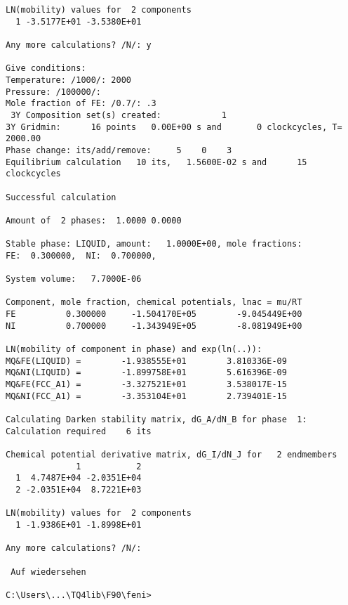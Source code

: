 \documentclass[12pt]{article}
\begin{document}
{\begin{verbatim}
LN(mobility) values for  2 components
  1 -3.5177E+01 -3.5380E+01

Any more calculations? /N/: y

Give conditions:
Temperature: /1000/: 2000
Pressure: /100000/:
Mole fraction of FE: /0.7/: .3
 3Y Composition set(s) created:            1
3Y Gridmin:      16 points   0.00E+00 s and       0 clockcycles, T= 2000.00
Phase change: its/add/remove:     5    0    3
Equilibrium calculation   10 its,   1.5600E-02 s and      15 clockcycles

Successful calculation

Amount of  2 phases:  1.0000 0.0000

Stable phase: LIQUID, amount:   1.0000E+00, mole fractions:
FE:  0.300000,  NI:  0.700000,

System volume:   7.7000E-06

Component, mole fraction, chemical potentials, lnac = mu/RT
FE          0.300000     -1.504170E+05        -9.045449E+00
NI          0.700000     -1.343949E+05        -8.081949E+00

LN(mobility of component in phase) and exp(ln(..)):
MQ&FE(LIQUID) =        -1.938555E+01        3.810336E-09
MQ&NI(LIQUID) =        -1.899758E+01        5.616396E-09
MQ&FE(FCC_A1) =        -3.327521E+01        3.538017E-15
MQ&NI(FCC_A1) =        -3.353104E+01        2.739401E-15

Calculating Darken stability matrix, dG_A/dN_B for phase  1:
Calculation required    6 its

Chemical potential derivative matrix, dG_I/dN_J for   2 endmembers
              1           2
  1  4.7487E+04 -2.0351E+04
  2 -2.0351E+04  8.7221E+03

LN(mobility) values for  2 components
  1 -1.9386E+01 -1.8998E+01

Any more calculations? /N/:

 Auf wiedersehen

C:\Users\...\TQ4lib\F90\feni>
\end{verbatim}}
\end{document}
